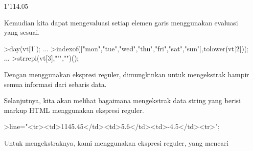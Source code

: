 \documentclass[a4paper,10pt]{article}
\begin{document}
\begin{eulernotebook}
\begin{eulercomment}
\begin{eulercomment}
\begin{eulercomment}
\begin{eulercomment}
\begin{eulercomment}
\begin{eulercomment}
\begin{eulercomment}
\begin{eulercomment}
\begin{eulercomment}
\begin{eulercomment}
\begin{eulercomment}
\begin{eulercomment}
\begin{eulercomment}
\begin{eulercomment}
\begin{eulercomment}
\begin{eulercomment}
\begin{euleroutput}
  1'114.05
\end{euleroutput}
\begin{eulercomment}
Kemudian kita dapat mengevaluasi setiap elemen garis menggunakan
evaluasi yang sesuai.
\end{eulercomment}
\begin{eulerprompt}
>day(vt[1]);  ...
>indexof(["mon","tue","wed","thu","fri","sat","sun"],tolower(vt[2]));  ...
>strrepl(vt[3],"'","")();
\end{eulerprompt}
\begin{eulercomment}
Dengan menggunakan ekspresi reguler, dimungkinkan untuk mengekstrak
hampir semua informasi dari sebaris data.

Selanjutnya, kita akan melihat bagaimana mengekstrak data string yang
berisi markup HTML menggunakan ekspresi reguler.
\end{eulercomment}
\begin{eulerprompt}
>line="<tr><td>1145.45</td><td>5.6</td><td>-4.5</td><tr>";
\end{eulerprompt}
\begin{eulercomment}
Untuk mengekstraknya, kami menggunakan ekspresi reguler, yang mencari


\end{eulercomment}
\end{eulercomment}
\end{eulercomment}
\end{eulercomment}
\end{eulercomment}
\end{eulercomment}
\end{eulercomment}
\end{eulercomment}
\end{eulercomment}
\end{eulercomment}
\end{eulercomment}
\end{eulercomment}
\end{eulercomment}
\end{eulercomment}
\end{eulercomment}
\end{eulercomment}
\end{eulercomment}
\end{eulernotebook}
\end{document}
